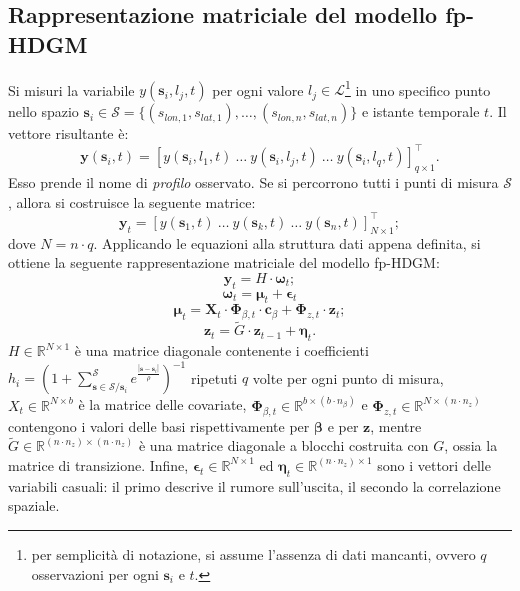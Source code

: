 \subsection[Rappresentazione matriciale del modello fp-HDGM]{Rappresentazione matriciale del modello fp-HDGM}
Si misuri la variabile $y(\mathbf{s}_i, l_j, t)$ per ogni valore $l_j\in \mathcal{L}$\footnote{per semplicità di notazione, si assume l'assenza di dati mancanti, ovvero $q$ osservazioni per ogni $\mathbf{s}_i$ e $t$.} in uno specifico punto nello spazio $\mathbf{s}_i\in\mathcal{S} = \{(s_{lon,1}, s_{lat,1}),\dots,(s_{lon,n}, s_{lat,n})\}$ e istante temporale $t$. Il vettore risultante è:
\[
\mathbf{y}(\mathbf{s}_i, t) = \left[ y(\mathbf{s}_i, l_1, t) \ \dots \ y(\mathbf{s}_i, l_j, t) \ \dots \ y(\mathbf{s}_i, l_q, t) \right]^\top_{q\times 1}.
\]
Esso prende il nome di \textit{profilo} osservato. Se si percorrono tutti i punti di misura $\mathcal{S}$, allora si costruisce la seguente matrice:
\[
\mathbf{y}_t = \left[ {y}(\mathbf{s}_1, t) \ \dots \ {y}(\mathbf{s}_k, t) \ \dots \ {y}(\mathbf{s}_n, t) \right]^\top_{N\times 1};
\]
dove $N=n\cdot q$. Applicando le equazioni alla struttura dati appena definita, si ottiene la seguente rappresentazione matriciale del modello fp-HDGM:
\begin{equation}
	\mathbf{y}_t = H\cdot\boldsymbol{\omega}_t;
\end{equation}
\begin{equation}
	\boldsymbol{\omega}_t = \boldsymbol{\mu}_t + \boldsymbol{\epsilon}_t
\end{equation}
\begin{equation}
	\boldsymbol{\mu}_t = \mathbf{X}_t\cdot\boldsymbol{\Phi}_{\beta, t}\cdot\mathbf{c}_\beta + \boldsymbol{\Phi}_{z, t}\cdot\mathbf{z}_t;
\end{equation}
\begin{equation}
	\mathbf{z}_t = \tilde{G}\cdot\mathbf{z}_{t-1} + \boldsymbol{\eta}_t.
\end{equation}
$H\in\mathbb{R}^{N\times 1}$ è una matrice diagonale contenente i coefficienti $h_i = \left( 1 + \sum_{\mathbf{s}\in\mathcal{S}/\mathbf{s}_i}^{\mathcal{S}} e^{\frac{|\mathbf{s} - \mathbf{s}_i|}{\rho}}\right)^{-1}$ ripetuti $q$ volte per ogni punto di misura, $X_t\in\mathbb{R}^{N\times b}$ è la matrice delle covariate, $\boldsymbol{\Phi}_{\beta, t}\in\mathbb{R}^{b\times (b\cdot n_\beta)}$ e $\boldsymbol{\Phi}_{z, t}\in\mathbb{R}^{N\times(n\cdot n_z)}$ contengono i valori delle basi rispettivamente per $\boldsymbol{\beta}$ e per $\mathbf{z}$, mentre $\tilde{G}\in\mathbb{R}^{(n\cdot n_z)\times (n\cdot n_z)}$ è una matrice diagonale a blocchi costruita con $G$, ossia la matrice di transizione. Infine, $\boldsymbol{\epsilon}_t\in\mathbb{R}^{N\times 1}$ ed $\boldsymbol{\eta}_t\in\mathbb{R}^{(n\cdot n_z)\times 1}$ sono i vettori delle variabili casuali: il primo descrive il rumore sull'uscita, il secondo la correlazione spaziale.

